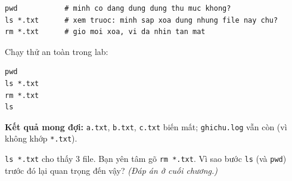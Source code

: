 \documentclass[12pt,a4paper]{article}
\newcommand{\cmd}[1]{\texttt{#1}}
\begin{document}
\begin{Verbatim}
pwd           # minh co dang dung dung thu muc khong?
ls *.txt      # xem truoc: minh sap xoa dung nhung file nay chu?
rm *.txt      # gio moi xoa, vi da nhin tan mat
\end{Verbatim}

Chạy thử an toàn trong lab:
\begin{Verbatim}
pwd
ls *.txt
rm *.txt
ls
\end{Verbatim}
\textbf{Kết quả mong đợi:} \cmd{a.txt}, \cmd{b.txt}, \cmd{c.txt} biến mất; \cmd{ghichu.log} vẫn còn (vì không khớp \cmd{*.txt}).

\begin{checkbox}[title={Tự kiểm tra 6}]
\cmd{ls *.txt} cho thấy 3 file. Bạn yên tâm gõ \cmd{rm *.txt}. Vì sao bước \cmd{ls} (và \cmd{pwd}) trước đó lại quan trọng đến vậy? \textit{(Đáp án ở cuối chương.)}
\end{checkbox}
\end{document}
